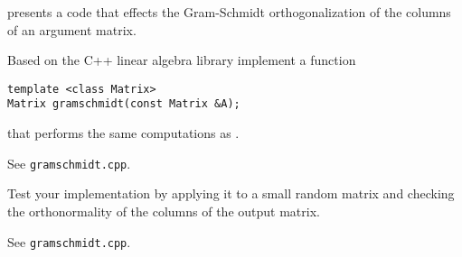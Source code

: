 \renewcommand{\chpt}{ch_matvec}

\begin{problem}
  \label{prb:gramschmidteigen} 
   presents a \matlab{} code that effects the Gram-Schmidt
  orthogonalization of the columns of an argument matrix. 

  \begin{subproblem}[2]
    \label{sp:strassen:1}
    Based on the
    C++ linear algebra library \eigen{} implement a function
\begin{lstlisting}[style=cppsimple]
template <class Matrix>  
Matrix gramschmidt(const Matrix &A);
\end{lstlisting}
    that performs the same computations as . 

    \begin{solution}
     See \texttt{gramschmidt.cpp}.
    \end{solution}
  \end{subproblem}

  \begin{subproblem}[2]
    \label{sp:strassen:2}
    Test your implementation by applying it to a small random matrix
    and checking the orthonormality of the columns of the output
    matrix. 

    \begin{solution}
     See \texttt{gramschmidt.cpp}.
    \end{solution}

  \end{subproblem}
\end{problem}
